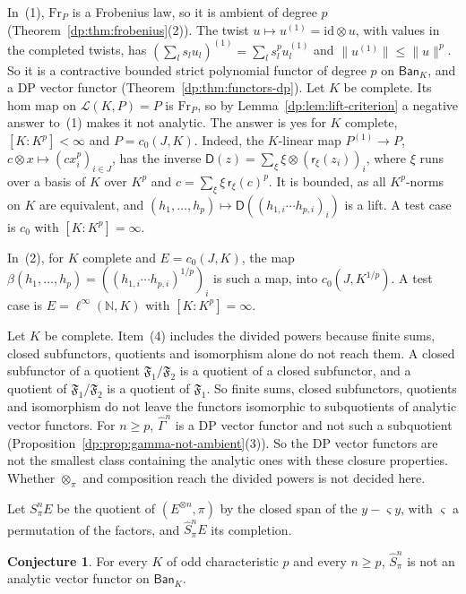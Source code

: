 \documentclass[11pt]{amsart}
\theoremstyle{definition}
\theoremstyle{remark}
\numberwithin{equation}{section}
\newcommand{\N}{\mathbb N}
\newcommand{\cL}{\mathcal L}
\newcommand{\id}{\mathrm{id}}
\newcommand{\norm}[1]{\lVert #1\rVert}
\theoremstyle{plain}
\theoremstyle{definition}
\newtheorem{conjecture}[theorem]{Conjecture}
\theoremstyle{plain}
\newcommand{\hGamma}{\widehat\Gamma}
\begin{document}
In~(1), $\mathrm{Fr}_P$ is a Frobenius law, so it is ambient of degree $p$ (Theorem~\ref{dp:thm:frobenius}(2)). The twist $u\mapsto u^{(1)}=\id\otimes u$, with values in the completed twists, has $(\sum_ls_lu_l)^{(1)}=\sum_ls_l^pu_l^{(1)}$ and $\norm{u^{(1)}}\le\norm u^p$. So it is a contractive bounded strict polynomial functor of degree $p$ on $\mathsf{Ban}_K$, and a DP vector functor (Theorem~\ref{dp:thm:functors-dp}). Let $K$ be complete. Its hom map on $\cL(K,P)=P$ is $\mathrm{Fr}_P$, so by Lemma~\ref{dp:lem:lift-criterion} a negative answer to~(1) makes it not analytic. The answer is yes for $K$ complete, $[K:K^p]<\infty$ and $P=c_0(J,K)$. Indeed, the $K$-linear map $P^{(1)}\to P$, $c\otimes x\mapsto(cx_i^p)_{i\in J}$, has the inverse $\mathsf D(z)=\sum_\xi\xi\otimes(\mathsf r_\xi(z_i))_i$, where $\xi$ runs over a basis of $K$ over $K^p$ and $c=\sum_\xi\xi\,\mathsf r_\xi(c)^p$. It is bounded, as all $K^p$-norms on $K$ are equivalent, and $(h_1,\dots,h_p)\mapsto\mathsf D((h_{1,i}\cdots h_{p,i})_i)$ is a lift. A test case is $c_0$ with $[K:K^p]=\infty$.

In~(2), for $K$ complete and $E=c_0(J,K)$, the map $\beta(h_1,\dots,h_p)=((h_{1,i}\cdots h_{p,i})^{1/p})_i$ is such a map, into $c_0(J,K^{1/p})$. A test case is $E=\ell^\infty(\N,K)$ with $[K:K^p]=\infty$.

Let $K$ be complete. Item~(4) includes the divided powers because finite sums, closed subfunctors, quotients and isomorphism alone do not reach them. A closed subfunctor of a quotient $\mathfrak F_1/\mathfrak F_2$ is a quotient of a closed subfunctor, and a quotient of $\mathfrak F_1/\mathfrak F_2$ is a quotient of $\mathfrak F_1$. So finite sums, closed subfunctors, quotients and isomorphism do not leave the functors isomorphic to subquotients of analytic vector functors. For $n\ge p$, $\hGamma^n$ is a DP vector functor and not such a subquotient (Proposition~\ref{dp:prop:gamma-not-ambient}(3)). So the DP vector functors are not the smallest class containing the analytic ones with these closure properties. Whether $\otimes_\pi$ and composition reach the divided powers is not decided here.

Let $S^n_\pi E$ be the quotient of $(E^{\otimes n},\pi)$ by the closed span of the $y-\varsigma y$, with $\varsigma$ a permutation of the factors, and $\widehat S^n_\pi E$ its completion.

\begin{conjecture}\label{dp:conj:symmetric}
For every $K$ of odd characteristic $p$ and every $n\ge p$, $\widehat S^n_\pi$ is not an analytic vector functor on $\mathsf{Ban}_K$.
\end{conjecture}
\end{document}
